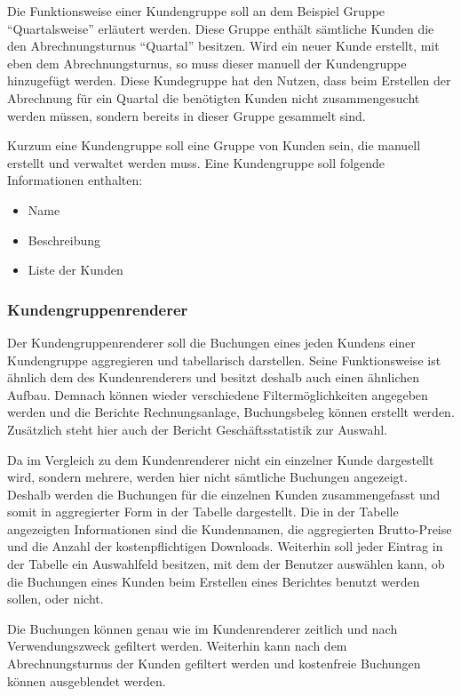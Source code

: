 Die Funktionsweise einer Kundengruppe soll an dem Beispiel Gruppe "`Quartalsweise"' erläutert werden.
Diese Gruppe enthält sämtliche Kunden die den Abrechnungsturnus "`Quartal"' besitzen. Wird ein neuer Kunde erstellt, mit eben dem Abrechnungsturnus, so muss dieser manuell der Kundengruppe hinzugefügt werden.
Diese Kundegruppe hat den Nutzen, dass beim Erstellen der Abrechnung für ein Quartal die benötigten Kunden nicht zusammengesucht werden müssen, sondern bereits in dieser Gruppe gesammelt sind.

Kurzum eine Kundengruppe soll eine Gruppe von Kunden sein, die manuell erstellt und verwaltet werden muss. Eine Kundengruppe soll folgende Informationen enthalten:
\begin{itemize}
\item Name
\item Beschreibung
\item Liste der Kunden
\end{itemize}
 
\subsubsection{Kundengruppenrenderer}
Der Kundengruppenrenderer soll die Buchungen eines jeden Kundens einer Kundengruppe aggregieren und tabellarisch darstellen.
Seine Funktionsweise ist ähnlich dem des Kundenrenderers und besitzt deshalb auch einen ähnlichen Aufbau.
Demnach können wieder verschiedene Filtermöglichkeiten angegeben werden und die Berichte Rechnungsanlage, Buchungsbeleg können erstellt werden. Zusätzlich steht hier auch der Bericht Geschäftsstatistik zur Auswahl.

Da im Vergleich zu dem Kundenrenderer nicht ein einzelner Kunde dargestellt wird, sondern mehrere, werden hier nicht sämtliche Buchungen angezeigt. Deshalb werden die Buchungen für die einzelnen Kunden zusammengefasst und somit in aggregierter Form in der Tabelle dargestellt.
Die in der Tabelle angezeigten Informationen sind die Kundennamen, die aggregierten Brutto-Preise und die Anzahl der kostenpflichtigen Downloads. Weiterhin soll jeder Eintrag in der Tabelle ein Auswahlfeld besitzen, mit dem der Benutzer auswählen kann, ob die Buchungen eines Kunden beim Erstellen eines Berichtes benutzt werden sollen, oder nicht.

Die Buchungen können genau wie im Kundenrenderer zeitlich und nach Verwendungszweck gefiltert werden. Weiterhin kann nach dem Abrechnungsturnus der Kunden gefiltert werden und kostenfreie Buchungen können ausgeblendet werden.

